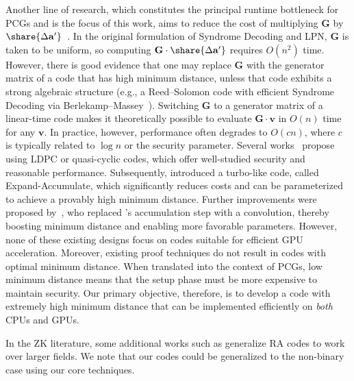 Another line of research, which constitutes the principal runtime bottleneck for PCGs and is the focus of this work, aims to reduce the cost of multiplying \(\mathbf{G}\) by \(\share{\Delta \mathbf{a}'}\)~\cite{CCS:BCGI18,silentOTCCS,silentOTcrypto,ringLpn,silver,EA,EC}. 
In the original formulation of Syndrome Decoding and LPN, \(\mathbf{G}\) is taken to be uniform, so computing \(\mathbf{G} \cdot \share{\Delta \mathbf{a}'}\) requires \(O(n^2)\) time. 
However, there is good evidence that one may replace \(\mathbf{G}\) with the generator matrix of a code that has high minimum distance, unless that code exhibits a strong algebraic structure (e.g., a Reed--Solomon code with efficient Syndrome Decoding via Berlekamp--Massey~\cite{Berlekamp68}). %
Switching \(\mathbf{G}\) to a generator matrix of a linear-time code makes it theoretically possible to evaluate \(\mathbf{G} \cdot \mathbf{v}\) in \(O(n)\) time for any \(\mathbf{v}\). 
In practice, however, performance often degrades to \(O(c n)\), where \(c\) is typically related to \(\log n\) or the security parameter.
Several works~\cite{CCS:BCGI18,silentOTCCS,silentOTcrypto} propose using LDPC or quasi-cyclic codes, which offer well-studied security and reasonable performance. 
Subsequently, \cite{EA} introduced a turbo-like code, called Expand-Accumulate, which significantly reduces costs and can be parameterized to achieve a provably high minimum distance. 
Further improvements were proposed by~\cite{EC}, who replaced \cite{EA}'s accumulation step with a convolution, thereby boosting minimum distance and enabling more favorable parameters. 
However, none of these existing designs focus on codes suitable for efficient GPU acceleration. Moreover, existing proof techniques do not result in codes with optimal minimum distance. When translated into the context of PCGs, low minimum distance means that the setup phase must be more expensive to maintain security. 
Our primary objective, therefore, is to develop a code with extremely high minimum distance that can be implemented efficiently on \emph{both} CPUs and GPUs.

In the ZK literature, some additional works such as \cite{field,blaze} generalize RA codes \cite{spielman} to work over larger fields. We note that our codes could be generalized to the non-binary case using our core techniques. 
